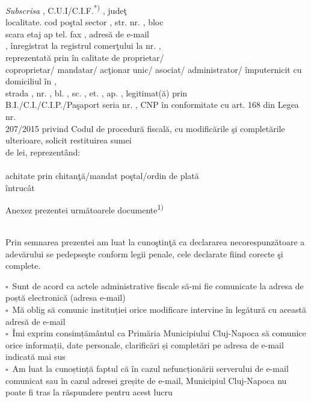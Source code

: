 \documentclass[11pt,a4paper]{article}
\newcommand{\fillline}[1][6cm]{\underline{\hspace{#1}}}
\newcommand{\checkboxempty}{$\square$}
\begin{document}
\hspace{0.5cm}\textit{Subscrisa} \fillline[8cm], C.U.I/C.I.F.\textsuperscript{*)} \fillline[4cm], judeţ \fillline[3cm]\\
localitate. \fillline[4cm] cod poştal \fillline[3cm] sector \fillline[1cm], str. \fillline[6cm] nr. \fillline[1.5cm], bloc \fillline[1.5cm]\\
scara \fillline[1.5cm] etaj \fillline[1.5cm] ap \fillline[2cm] tel. \fillline[3cm] fax \fillline[3cm], adresă de e-mail\\
\fillline[6cm], înregistrat la registrul comerţului \fillline[4cm] la nr. \fillline[3cm],\\
reprezentată prin \fillline[8cm] în calitate de proprietar/\\
coproprietar/ mandatar/ acţionar unic/ asociat/ administrator/ împuternicit cu domiciliul în \fillline[5cm],\\
strada \fillline[6cm], nr. \fillline[1.5cm], bl. \fillline[1.5cm], sc. \fillline[1cm], et. \fillline[1cm], ap. \fillline[1cm], legitimat(ă) prin\\
B.I./C.I./C.I.P./Paşaport seria \fillline[1.5cm] nr. \fillline[3cm], CNP \fillline[5cm] în conformitate cu art. 168 din Legea nr.\\
207/2015 privind Codul de procedură fiscală, cu modificările şi completările ulterioare, solicit restituirea sumei\\
de \fillline[4cm] lei, reprezentând: \hrulefill\\
\hrulefill\\
achitate prin chitanţă/mandat poştal/ordin de plată \hrulefill\\
întrucât \hrulefill\\
\hrulefill

\vspace{0.3cm}

\hspace{0.5cm}Anexez prezentei următoarele documente\textsuperscript{1)} \hrulefill\\
\hrulefill\\
\hrulefill

\vspace{0.3cm}

Prin semnarea prezentei am luat la cunoştinţă ca declararea necorespunzătoare a adevărului se pedepseşte conform legii penale, cele declarate fiind corecte şi complete.

\vspace{0.2cm}

\checkboxempty\ Sunt de acord ca actele administrative fiscale să-mi fie comunicate la adresa de poștă electronică (adresa e-mail)\\
\checkboxempty\ Mă oblig să comunic instituției orice modificare intervine în legătură cu această adresă de e-mail\\
\checkboxempty\ Îmi exprim consimțământul ca Primăria Municipiului Cluj-Napoca să comunice orice informații, date personale, clarificări și completări pe adresa de e-mail indicată mai sus\\
\checkboxempty\ Am luat la cunoștință faptul că în cazul nefuncționării serverului de e-mail comunicat sau în cazul adresei greșite de e-mail, Municipiul Cluj-Napoca nu poate fi tras la răspundere pentru acest lucru
\end{document}
